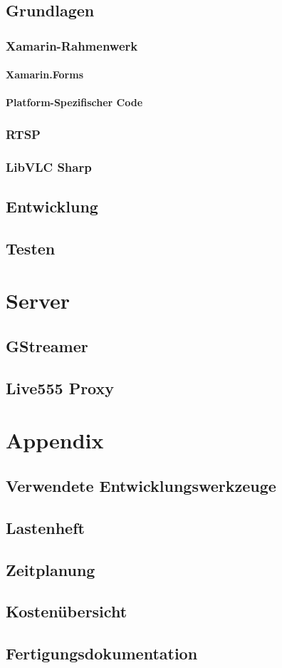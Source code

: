 \documentclass[a4paper, 12pt, twoside, openright
]{memoir}
\begin{document}
\chapter{Grundlagen}
\section{Xamarin-Rahmenwerk}
\subsection{Xamarin.Forms}
\subsection{Platform-Spezifischer Code}
\section{RTSP}
\section{LibVLC Sharp}
\chapter{Entwicklung}
\chapter{Testen}

\part{Server}
\chapter{GStreamer}
\chapter{Live555 Proxy}

\appendix
\part{Appendix}
\chapter{Verwendete Entwicklungswerkzeuge}
\chapter{Lastenheft}
\chapter{Zeitplanung}
\chapter{Kostenübersicht}
\chapter{Fertigungsdokumentation}

\printacronyms[heading=chapter]
\end{document}
